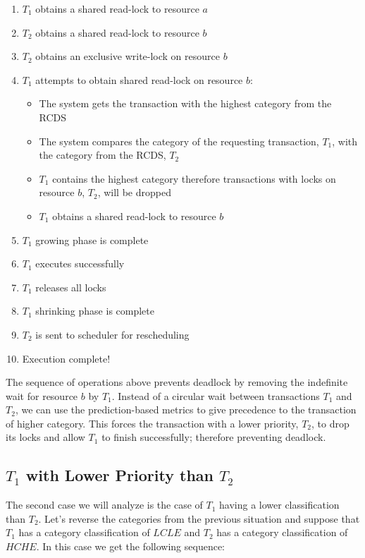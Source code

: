 \documentclass[conference]{IEEEtran}
\begin{document}
\begin{enumerate}
  \item $T_{1}$ obtains a shared read-lock to resource $a$
  \item $T_{2}$ obtains a shared read-lock to resource $b$
  \item $T_{2}$ obtains an exclusive write-lock on resource $b$
  \item $T_{1}$ attempts to obtain shared read-lock on resource $b$:
    \begin{itemize}
        \item The system gets the transaction with the highest category from the RCDS
        \item The system compares the category of the requesting transaction, $T_{1}$, with the category from the RCDS, $T_{2}$
        \item $T_{1}$ contains the highest category therefore transactions with locks on resource $b$, $T_{2}$, will be dropped
        \item $T_{1}$ obtains a shared read-lock to resource $b$
    \end{itemize}
  \item $T_{1}$ growing phase is complete
  \item $T_{1}$ executes successfully
  \item $T_{1}$ releases all locks
  \item $T_{1}$ shrinking phase is complete
  \item $T_{2}$ is sent to scheduler for rescheduling
  \item Execution complete!
\end{enumerate}

The sequence of operations above prevents deadlock by removing the indefinite wait for resource $b$ by $T_{1}$. Instead of a circular wait between transactions $T_{1}$ and $T_{2}$, we can use the prediction-based metrics to give precedence to the transaction of higher category. This forces the transaction with a lower priority, $T_{2}$, to drop its locks and allow $T_{1}$ to finish successfully; therefore preventing deadlock.

\subsection{$T_{1}$ with Lower Priority than $T_{2}$}
\label{sec:t1_lower_than_t2}
The second case we will analyze is the case of $T_{1}$ having a lower classification than $T_{2}$. Let's reverse the categories from the previous situation and suppose that $T_{1}$ has a category classification of $LCLE$ and $T_{2}$ has a category classification of $HCHE$. In this case we get the following sequence:
\end{document}
